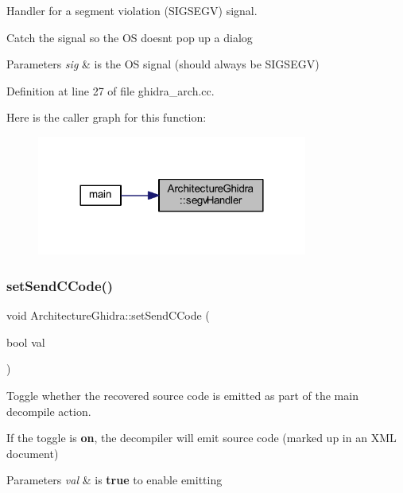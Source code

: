 Handler for a segment violation (S\+I\+G\+S\+E\+GV) signal. 

Catch the signal so the OS doesn\textquotesingle{}t pop up a dialog 
\begin{DoxyParams}{Parameters}
{\em sig} & is the OS signal (should always be S\+I\+G\+S\+E\+GV) \\
\hline
\end{DoxyParams}


Definition at line 27 of file ghidra\+\_\+arch.\+cc.

Here is the caller graph for this function\+:
\nopagebreak
\begin{figure}[H]
\begin{center}
\leavevmode
\includegraphics[width=252pt]{class_architecture_ghidra_a606fbae6a63c41723343137c56f84eca_icgraph}
\end{center}
\end{figure}
\mbox{\label{class_architecture_ghidra_a9c5dc81edf25bc5754821f69a83cd091}} 
\subsubsection{\texorpdfstring{setSendCCode()}{setSendCCode()}}
{\footnotesize\ttfamily void Architecture\+Ghidra\+::set\+Send\+C\+Code (\begin{DoxyParamCaption}\item[{bool}]{val }\end{DoxyParamCaption})\hspace{0.3cm}{\ttfamily [inline]}}



Toggle whether the recovered source code is emitted as part of the main decompile action. 

If the toggle is {\bfseries{on}}, the decompiler will emit source code (marked up in an X\+ML document) 
\begin{DoxyParams}{Parameters}
{\em val} & is {\bfseries{true}} to enable emitting \\
\hline
\end{DoxyParams}



